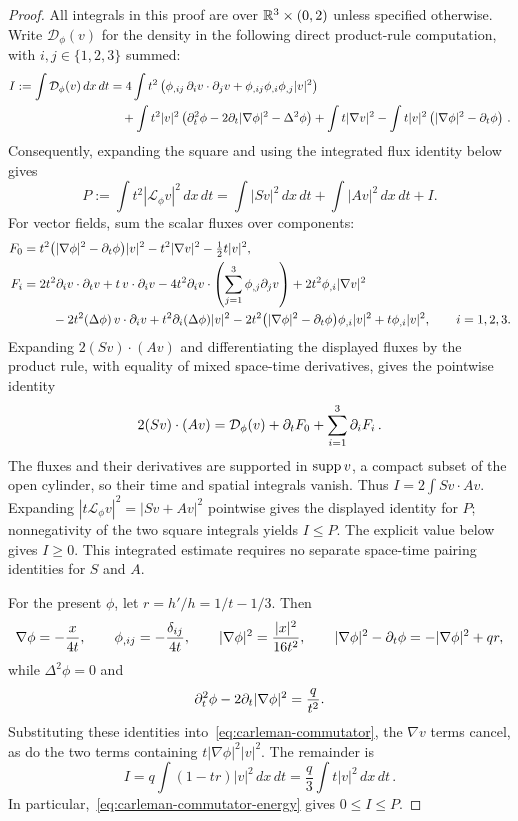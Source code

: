 \documentclass[11pt,letterpaper]{article}
\numberwithin{equation}{section}
\theoremstyle{plain}
\theoremstyle{definition}
\theoremstyle{remark}
\begin{document}
\begin{proof}
All integrals in this proof are over $\mathbb{R}^3\times(0,2)$ unless specified otherwise. Write $\mathcal D_\phi(v)$ for the density in the following direct product-rule computation, with $i,j\in\{1,2,3\}$ summed:
\begin{align}\label{eq:carleman-commutator}
 I:=\int\mathcal D_\phi(v)\,dx\,dt
 &=4\int t^2\left(\phi_{,ij}\,\partial_i v\cdot\partial_jv
             +\phi_{,ij}\phi_{,i}\phi_{,j}|v|^2\right)\\
 &\quad+\int t^2|v|^2
       \left(\partial_t^2\phi-2\partial_t|\nabla\phi|^2-\Delta^2\phi\right)
       +\int t|\nabla v|^2
       -\int t|v|^2\left(|\nabla\phi|^2-\partial_t\phi\right)\,.\nonumber
\end{align}
Consequently, expanding the square and using the integrated flux identity below gives
\begin{equation}\label{eq:carleman-commutator-energy}
 P:=\int t^2|\mathcal L_\phi v|^2\,dx\,dt
 =\int|Sv|^2\,dx\,dt+\int|Av|^2\,dx\,dt+I.
\end{equation}
For vector fields, sum the scalar fluxes over components:
\begin{align*}
 F_0={}&t^2\bigl(|\nabla\phi|^2-\partial_t\phi\bigr)|v|^2
          -t^2|\nabla v|^2-\tfrac12t|v|^2,\\
 F_i={}&2t^2\partial_i v\cdot\partial_t v+t\,v\cdot\partial_i v
       -4t^2\partial_i v\cdot\left(\sum_{j=1}^3\phi_{,j}\partial_jv\right)
       +2t^2\phi_{,i}|\nabla v|^2\\
 &\quad-2t^2(\Delta\phi)\,v\cdot\partial_i v
       +t^2\partial_i(\Delta\phi)|v|^2
       -2t^2\bigl(|\nabla\phi|^2-\partial_t\phi\bigr)\phi_{,i}|v|^2
       +t\phi_{,i}|v|^2,\qquad i=1,2,3.
\end{align*}
Expanding $2(Sv)\cdot(Av)$ and differentiating the displayed fluxes by the product rule, with equality of mixed space-time derivatives, gives the pointwise identity
\begin{equation*}
 2(Sv)\cdot(Av)=\mathcal D_\phi(v)+\partial_t F_0+\sum_{i=1}^3\partial_iF_i\,.
\end{equation*}
The fluxes and their derivatives are supported in $\operatorname{supp} v$, a compact subset of the open cylinder, so their time and spatial integrals vanish. Thus $I=2\int Sv\cdot Av$. Expanding $|t\mathcal L_\phi v|^2=|Sv+Av|^2$ pointwise gives the displayed identity for $P$; nonnegativity of the two square integrals yields $I\leq P$. The explicit value below gives $I\geq0$. This integrated estimate requires no separate space-time pairing identities for $S$ and $A$.

For the present $\phi$, let $r=h'/h=1/t-1/3$. Then
\[
 \nabla\phi=-\frac{x}{4t},\qquad \phi_{,ij}=-\frac{\delta_{ij}}{4t},
 \qquad |\nabla\phi|^2=\frac{|x|^2}{16t^2},
 \qquad |\nabla\phi|^2-\partial_t\phi=-|\nabla\phi|^2+q r,
\]
while $\Delta^2\phi=0$ and
\[
 \partial_t^2\phi-2\partial_t|\nabla\phi|^2=\frac{q}{t^2}.
\]
Substituting these identities into~\eqref{eq:carleman-commutator}, the $\nabla v$ terms cancel, as do the two terms containing $t|\nabla\phi|^2|v|^2$. The remainder is
\begin{equation}\label{eq:carleman-I}
 I=q\int(1-tr)|v|^2\,dx\,dt
   =\frac{q}{3}\int t|v|^2\,dx\,dt\,.
\end{equation}
In particular,~\eqref{eq:carleman-commutator-energy} gives $0\le I\le P$.


\end{proof}
\end{document}
